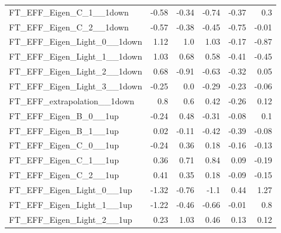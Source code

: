 \begin{table}[htbp]
{\begin{tabular}{lrrrrr}
FT\_EFF\_Eigen\_C\_1\_\_1down      & -0.58            & -0.34              & -0.74              & -0.37              & 0.3                \\
FT\_EFF\_Eigen\_C\_2\_\_1down      & -0.57            & -0.38              & -0.45              & -0.75              & -0.01              \\
FT\_EFF\_Eigen\_Light\_0\_\_1down  & 1.12             & 1.0                & 1.03               & -0.17              & -0.87              \\
FT\_EFF\_Eigen\_Light\_1\_\_1down  & 1.03             & 0.68               & 0.58               & -0.41              & -0.45              \\
FT\_EFF\_Eigen\_Light\_2\_\_1down  & 0.68             & -0.91              & -0.63              & -0.32              & 0.05               \\
FT\_EFF\_Eigen\_Light\_3\_\_1down  & -0.25            & 0.0                & -0.29              & -0.23              & -0.06              \\
FT\_EFF\_extrapolation\_\_1down    & 0.8              & 0.6                & 0.42               & -0.26              & 0.12               \\
FT\_EFF\_Eigen\_B\_0\_\_1up        & -0.24            & 0.48               & -0.31              & -0.08              & 0.1                \\
FT\_EFF\_Eigen\_B\_1\_\_1up        & 0.02             & -0.11              & -0.42              & -0.39              & -0.08              \\
FT\_EFF\_Eigen\_C\_0\_\_1up        & -0.24            & 0.36               & 0.18               & -0.16              & -0.13              \\
FT\_EFF\_Eigen\_C\_1\_\_1up        & 0.36             & 0.71               & 0.84               & 0.09               & -0.19              \\
FT\_EFF\_Eigen\_C\_2\_\_1up        & 0.41             & 0.35               & 0.18               & -0.09              & -0.15              \\
FT\_EFF\_Eigen\_Light\_0\_\_1up    & -1.32            & -0.76              & -1.1               & 0.44               & 1.27               \\
FT\_EFF\_Eigen\_Light\_1\_\_1up    & -1.22            & -0.46              & -0.66              & -0.01              & 0.8                \\
FT\_EFF\_Eigen\_Light\_2\_\_1up    & 0.23             & 1.03               & 0.46               & 0.13               & 0.12               \\

\end{tabular}}
\end{table}
